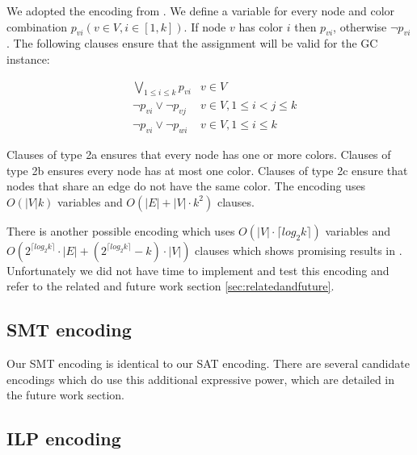 \documentclass{sig-alternate}
\begin{document}
We adopted the encoding from \cite{cs395tGCtoSAT}.
We define a variable for every node and color combination $p_{vi} (v \in V, i \in [1,k])$.
If node $v$ has color $i$ then $p_{vi}$, otherwise $\neg p_{vi}$.
The following clauses ensure that the assignment will be valid for the GC instance:

\setcounter{equation}{1}
\begin{subequations}
\begin{align}
        & \bigvee_{1 \leq i \leq k} p_{vi}& v \in V\\
        & \neg p_{vi} \lor \neg p_{vj} & v \in V, 1 \leq i < j \leq k \\
        & \neg p_{vi} \lor \neg p_{wi} & v \in V, 1 \leq i \leq k
\end{align}
\end{subequations}

Clauses of type 2a ensures that every node has one or more colors. Clauses of type 2b ensures every node has at most one color. Clauses of type 2c ensure that nodes that share an edge do not have the same color.
The encoding uses $O(|V| k)$ variables and $O(|E|+|V| \cdot k^2)$ clauses.

There is another possible encoding which uses $O(|V| \cdot \lceil{log_2{k}\rceil})$ variables and $O(2^{\lceil{log_2k}\rceil} \cdot |E|+(2^{\lceil{log_2k\rceil}}-k) \cdot |V|)$ clauses which shows promising results in \cite{wille2008using}.
Unfortunately we did not have time to implement and test this encoding and refer to the related and future work section \ref{sec:relatedandfuture}.

\subsection{SMT encoding}
Our SMT encoding is identical to our SAT encoding.
There are several candidate encodings which do use this additional expressive power, which are detailed in the future work section.

\subsection{ILP encoding}
\end{document}
